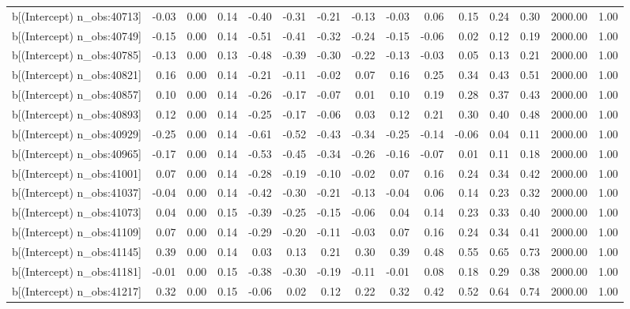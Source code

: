 \begin{table}[ht]
\begin{tabular}{rrrrrrrrrrrrrrr}
  b[(Intercept) n\_obs:40713] & -0.03 & 0.00 & 0.14 & -0.40 & -0.31 & -0.21 & -0.13 & -0.03 & 0.06 & 0.15 & 0.24 & 0.30 & 2000.00 & 1.00 \\ 
  b[(Intercept) n\_obs:40749] & -0.15 & 0.00 & 0.14 & -0.51 & -0.41 & -0.32 & -0.24 & -0.15 & -0.06 & 0.02 & 0.12 & 0.19 & 2000.00 & 1.00 \\ 
  b[(Intercept) n\_obs:40785] & -0.13 & 0.00 & 0.13 & -0.48 & -0.39 & -0.30 & -0.22 & -0.13 & -0.03 & 0.05 & 0.13 & 0.21 & 2000.00 & 1.00 \\ 
  b[(Intercept) n\_obs:40821] & 0.16 & 0.00 & 0.14 & -0.21 & -0.11 & -0.02 & 0.07 & 0.16 & 0.25 & 0.34 & 0.43 & 0.51 & 2000.00 & 1.00 \\ 
  b[(Intercept) n\_obs:40857] & 0.10 & 0.00 & 0.14 & -0.26 & -0.17 & -0.07 & 0.01 & 0.10 & 0.19 & 0.28 & 0.37 & 0.43 & 2000.00 & 1.00 \\ 
  b[(Intercept) n\_obs:40893] & 0.12 & 0.00 & 0.14 & -0.25 & -0.17 & -0.06 & 0.03 & 0.12 & 0.21 & 0.30 & 0.40 & 0.48 & 2000.00 & 1.00 \\ 
  b[(Intercept) n\_obs:40929] & -0.25 & 0.00 & 0.14 & -0.61 & -0.52 & -0.43 & -0.34 & -0.25 & -0.14 & -0.06 & 0.04 & 0.11 & 2000.00 & 1.00 \\ 
  b[(Intercept) n\_obs:40965] & -0.17 & 0.00 & 0.14 & -0.53 & -0.45 & -0.34 & -0.26 & -0.16 & -0.07 & 0.01 & 0.11 & 0.18 & 2000.00 & 1.00 \\ 
  b[(Intercept) n\_obs:41001] & 0.07 & 0.00 & 0.14 & -0.28 & -0.19 & -0.10 & -0.02 & 0.07 & 0.16 & 0.24 & 0.34 & 0.42 & 2000.00 & 1.00 \\ 
  b[(Intercept) n\_obs:41037] & -0.04 & 0.00 & 0.14 & -0.42 & -0.30 & -0.21 & -0.13 & -0.04 & 0.06 & 0.14 & 0.23 & 0.32 & 2000.00 & 1.00 \\ 
  b[(Intercept) n\_obs:41073] & 0.04 & 0.00 & 0.15 & -0.39 & -0.25 & -0.15 & -0.06 & 0.04 & 0.14 & 0.23 & 0.33 & 0.40 & 2000.00 & 1.00 \\ 
  b[(Intercept) n\_obs:41109] & 0.07 & 0.00 & 0.14 & -0.29 & -0.20 & -0.11 & -0.03 & 0.07 & 0.16 & 0.24 & 0.34 & 0.41 & 2000.00 & 1.00 \\ 
  b[(Intercept) n\_obs:41145] & 0.39 & 0.00 & 0.14 & 0.03 & 0.13 & 0.21 & 0.30 & 0.39 & 0.48 & 0.55 & 0.65 & 0.73 & 2000.00 & 1.00 \\ 
  b[(Intercept) n\_obs:41181] & -0.01 & 0.00 & 0.15 & -0.38 & -0.30 & -0.19 & -0.11 & -0.01 & 0.08 & 0.18 & 0.29 & 0.38 & 2000.00 & 1.00 \\ 
  b[(Intercept) n\_obs:41217] & 0.32 & 0.00 & 0.15 & -0.06 & 0.02 & 0.12 & 0.22 & 0.32 & 0.42 & 0.52 & 0.64 & 0.74 & 2000.00 & 1.00 \\ 

\end{tabular}
\end{table}
